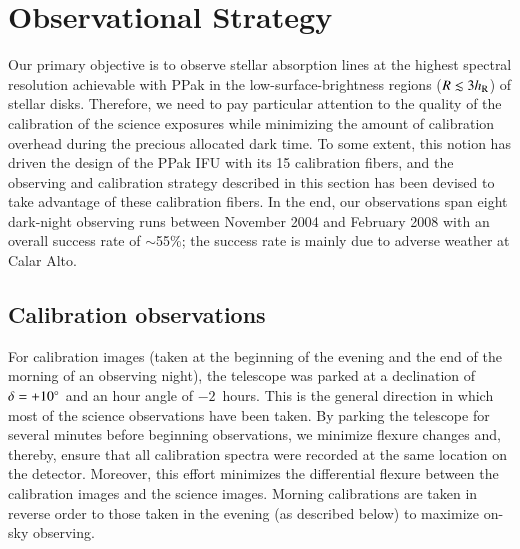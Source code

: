 \documentclass[traditabstract]{aa} %
\begin{document}
\section{Observational Strategy}
\label{sec:Observations}

Our primary objective is to observe stellar absorption lines at the highest
spectral resolution achievable with PPak in the low-surface-brightness regions
($R\lesssim3h_{\rm R}$) of stellar disks.  Therefore, we need to pay particular
attention to the quality of the calibration of the science exposures while
minimizing the amount of calibration overhead during the precious allocated dark
time.  To some extent, this notion has driven the design of the PPak IFU with
its 15 calibration fibers, and the observing and calibration strategy described
in this section has been devised to take advantage of these calibration fibers.
In the end, our observations span eight dark-night observing runs between
November 2004 and February 2008 with an overall success rate of $\sim$55\%; the
success rate is mainly due to adverse weather at Calar Alto.  


\subsection{Calibration observations}

For calibration images (taken at the beginning of the evening and the end of the
morning of an observing night), the telescope was parked at a declination of
$\delta=+10\mbox{$^\circ$}$ and an hour angle of $-2$~hours.  This is the general
direction in which most of the science observations have been taken.  By parking
the telescope for several minutes before beginning observations, we minimize
flexure changes and, thereby, ensure that all calibration spectra were recorded
at the same location on the detector.  Moreover, this effort minimizes the
differential flexure between the calibration images and the science images.
Morning calibrations are taken in reverse order to those taken in the evening
(as described below) to maximize on-sky observing.
\end{document}
